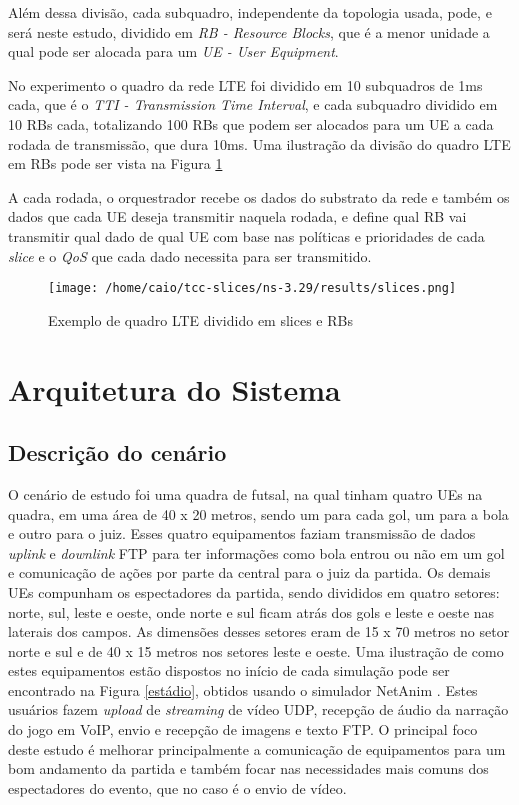 \documentclass[12pt, a4paper]{article}
\begin{document}
Além dessa divisão, cada subquadro, independente da topologia usada, pode, e será neste estudo, dividido em \textit{RB - Resource Blocks}, que é a menor unidade a qual pode ser alocada para um \textit{UE - User Equipment}.

No experimento o quadro da rede LTE foi dividido em 10 subquadros de 1ms cada, que é o  \textit{TTI - Transmission Time Interval}, e cada subquadro dividido em 10 RBs cada, totalizando 100 RBs que podem ser alocados para um UE a cada rodada de transmissão, que dura 10ms. Uma ilustração da divisão do quadro LTE em RBs pode ser vista na Figura \ref{slices}

A cada rodada, o orquestrador recebe os dados do substrato da rede e também os dados que cada UE deseja transmitir naquela rodada, e define qual RB vai transmitir qual dado de qual UE com base nas políticas e prioridades de cada \textit{slice} e o \textit{QoS} que cada dado necessita para ser transmitido.

\begin{figure}[H]
	\centering
	\texttt{[image: /home/caio/tcc-slices/ns-3.29/results/slices.png]}
	\caption{Exemplo de quadro LTE dividido em slices e RBs}
	\label{slices}
\end{figure}

\section{Arquitetura do Sistema}

\subsection{Descrição do cenário}

O cenário de estudo foi uma quadra de futsal, na qual tinham quatro UEs na quadra, em uma área de 40 x 20 metros, sendo um para cada gol, um para a bola e outro para o juiz. Esses quatro equipamentos faziam transmissão de dados \textit{uplink} e \textit{downlink} FTP para ter informações como bola entrou ou não em um gol e comunicação de ações por parte da central para o juiz da partida. Os demais UEs compunham os espectadores da partida, sendo divididos em quatro setores: norte, sul, leste e oeste, onde norte e sul ficam atrás dos gols e leste e oeste nas laterais dos campos. As dimensões desses setores eram de 15 x 70 metros no setor norte e sul e de 40 x 15 metros nos setores leste e oeste. Uma ilustração de como estes equipamentos estão dispostos no início de cada simulação pode ser encontrado na Figura \ref{estádio}, obtidos usando o simulador NetAnim \cite{netAnim}. Estes usuários fazem \textit{upload} de \textit{streaming} de vídeo UDP, recepção de áudio da narração do jogo em VoIP, envio e recepção de imagens e texto FTP. O principal foco deste estudo é melhorar principalmente a comunicação de equipamentos para um bom andamento da partida e também focar nas necessidades mais comuns dos espectadores do evento, que no caso é o envio de vídeo.
\end{document}

